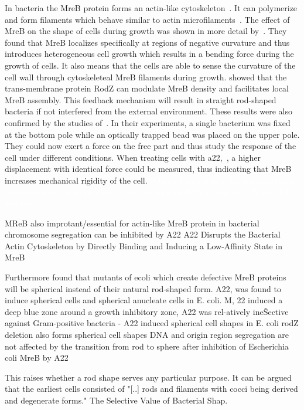 \documentclass{article}
\newcommand{\todo}[1]{\colorbox{WildStrawberry}{\textcolor{white}{#1}}}
\begin{document}
In bacteria the MreB protein forms an actin-like cytoskeleton~\cite{Erickson2001}.
It can polymerize and form filaments which behave similar to actin microfilaments~\cite{Dersch2020}.
The effect of MreB on the shape of cells during growth was shown in more detail
by~\cite{Ursell2014}.
They found that MreB localizes specifically at regions of negative curvature and thus introduces
heterogeneous cell growth which results in a bending force during the growth of cells.
It also means that the cells are able to sense the curvature of the cell wall through cytoskeleteal
MreB filaments during growth.
\cite{Bratton2018} showed that the trans-membrane protein RodZ can modulate MreB density and
facilitates local MreB assembly.
This feedback mechanism will result in straight rod-shaped bacteria if not interfered from the
external environment.
These results were also confirmed by the studies of~\cite{Wang2010}.
In their experiments, a single bacterium was fixed at the bottom pole while an optically trapped
bead was placed on the upper pole.
They could now exert a force on the free part and thus study the response of the cell under
different conditions.
When treating cells with \ac{a22},~\cite{IWAI2002,Gitai2005,Karczmarek2007,Bean2009}, a higher displacement with identical force could be measured, thus indicating that MreB increases mechanical rigidity of the cell.  \todo{@Jonas I do not find this information in those citation? Those citation all have to do with DNA segregation. Which did you mean?}

MReB also improtant/essential for actin-like MreB protein in bacterial chromosome segregation can be inhibited by A22 \cite{Gitai2005}A22 Disrupts the Bacterial Actin Cytoskeleton by Directly Binding and Inducing a Low-Affinity State in MreB \cite{Bean2009}


Furthermore \cite{Wachi1987} found that mutants of \ac{ecoli} which create defective MreB proteins will be spherical instead of their natural rod-shaped form.
A22, was found to induce spherical cells and spherical anucleate cells in E. coli. M, 22 induced a deep blue zone around a growth inhibitory zone, A22 was rel-atively ineŠective against Gram-positive bacteria - A22 induced spherical cell shapes in E. coli \cite{IWAI2002} 
rodZ deletion also forms spherical cell shapes \cite{Shiomi2008}
DNA and origin region segregation are not affected by the transition from rod to sphere after inhibition of Escherichia coli MreB by A22 \cite{Karczmarek2007}

This raises whether a rod shape serves any particular purpose.
It can be argued that the earliest cells consisted of "[..] rods and filaments with cocci being
derived and degenerate forms." \cite{Young2006} The Selective Value of Bacterial Shap.
\end{document}
